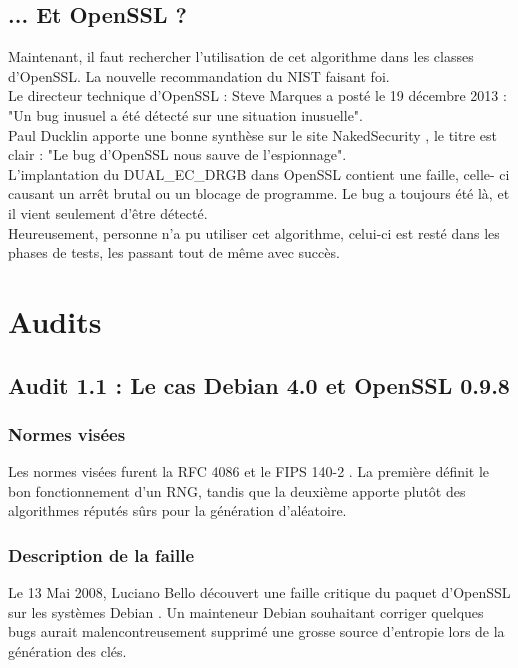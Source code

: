	\subsection{... Et OpenSSL ?}
	
	Maintenant, il faut rechercher l'utilisation de cet algorithme dans les 
	classes d'OpenSSL. La nouvelle recommandation du NIST faisant foi.\\

	Le directeur technique d'OpenSSL : Steve Marques a posté le 19 décembre 
	2013 : "Un bug inusuel a été détecté sur une situation inusuelle". \\
	
	Paul Ducklin apporte une bonne synthèse sur le site NakedSecurity
	\cite{duckin2013openssl}, le titre est clair : "Le bug d'OpenSSL nous
	sauve de l'espionnage".\\
	
	L'implantation du DUAL\_EC\_DRGB dans OpenSSL contient une faille, celle-
	ci causant un arrêt brutal ou un blocage de programme.
	Le bug a toujours été là, et il vient seulement d'être détecté.\\
	
	Heureusement, personne n'a pu utiliser cet algorithme, celui-ci est resté 
	dans les phases de tests, les passant tout de même avec succès.\\

\section{Audits}
	\subsection{Audit 1.1 : Le cas Debian 4.0 et OpenSSL 0.9.8}
		\subsubsection{Normes visées}
			Les normes visées furent la RFC 4086 \cite{rfc4086}
			et le FIPS 140-2 \cite{fips140-2}.
			La première définit le bon fonctionnement d'un RNG, tandis que 
			la deuxième	apporte plutôt des algorithmes réputés sûrs pour 
			la génération d'aléatoire.
		
		\subsubsection{Description de la faille}
			Le 13 Mai 2008, Luciano Bello découvert une faille critique du 
			paquet d'OpenSSL sur les systèmes Debian
			\cite{faille2008linux.org}. Un mainteneur Debian 	
			souhaitant corriger quelques bugs aurait malencontreusement 	
			supprimé une grosse source d'entropie lors de la génération des 
			clés. \\
			
